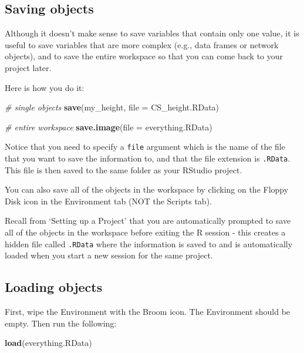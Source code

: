 \documentclass[
]{book}
\newenvironment{Shaded}{\begin{snugshade}}{\end{snugshade}}
\newcommand{\AttributeTok}[1]{\textcolor[rgb]{0.13,0.29,0.53}{#1}}
\newcommand{\CommentTok}[1]{\textcolor[rgb]{0.56,0.35,0.01}{\textit{#1}}}
\newcommand{\FunctionTok}[1]{\textcolor[rgb]{0.13,0.29,0.53}{\textbf{#1}}}
\newcommand{\NormalTok}[1]{#1}
\newcommand{\StringTok}[1]{\textcolor[rgb]{0.31,0.60,0.02}{#1}}
\begin{document}
\subsection{Saving objects}\label{saving-objects}

Although it doesn't make sense to save variables that contain only one value, it is useful to save variables that are more complex (e.g., data frames or network objects), and to save the entire workspace so that you can come back to your project later.

Here is how you do it:

\begin{Shaded}
\begin{Highlighting}[]
\CommentTok{\# single objects }
\FunctionTok{save}\NormalTok{(my\_height, }\AttributeTok{file =} \StringTok{\textquotesingle{}CS\_height.RData\textquotesingle{}}\NormalTok{)}

\CommentTok{\# entire workspace}
\FunctionTok{save.image}\NormalTok{(}\AttributeTok{file =} \StringTok{\textquotesingle{}everything.RData\textquotesingle{}}\NormalTok{)}
\end{Highlighting}
\end{Shaded}

Notice that you need to specify a \texttt{file} argument which is the name of the file that you want to save the information to, and that the file extension is \texttt{.RData}. This file is then saved to the same folder as your RStudio project.

You can also save all of the objects in the workspace by clicking on the Floppy Disk icon in the Environment tab (NOT the Scripts tab).

Recall from `Setting up a Project' that you are automatically prompted to save all of the objects in the workspace before exiting the R session - this creates a hidden file called \texttt{.RData} where the information is saved to and is automatically loaded when you start a new session for the same project.

\subsection{Loading objects}\label{loading-objects}

First, wipe the Environment with the Broom icon. The Environment should be empty. Then run the following:

\begin{Shaded}
\begin{Highlighting}[]
\FunctionTok{load}\NormalTok{(}\StringTok{\textquotesingle{}everything.RData\textquotesingle{}}\NormalTok{)}
\end{Highlighting}
\end{Shaded}
\end{document}
